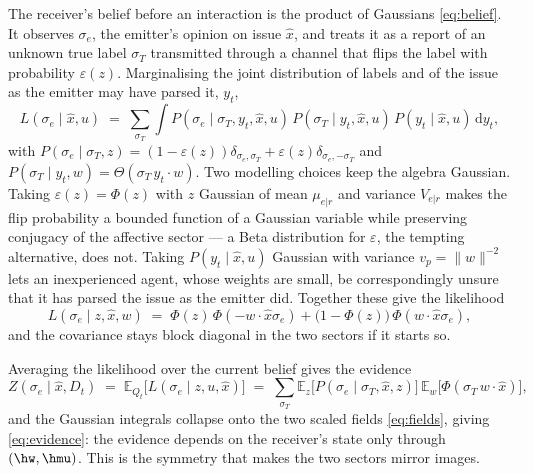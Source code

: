 The receiver's belief before an interaction is the product of Gaussians
\eqref{eq:belief}. It observes $\sigma_e$, the emitter's opinion on issue
$\hat{x}$, and treats it as a report of an unknown true label $\sigma_T$
transmitted through a channel that flips the label with probability
$\varepsilon(z)$. Marginalising the joint distribution of labels and of the issue
as the emitter may have parsed it, $y_t$,
%
\begin{equation}
  L(\sigma_e\mid \hat{x}, u) \;=\;
  \sum_{\sigma_T}\int P(\sigma_e\mid \sigma_T, y_t, \hat{x}, u)\,
  P(\sigma_T\mid y_t, \hat{x}, u)\,P(y_t\mid \hat{x}, u)\,\mathrm{d}y_t ,
\end{equation}
%
with $P(\sigma_e\mid\sigma_T,z)=(1-\varepsilon(z))\delta_{\sigma_e,\sigma_T} +
\varepsilon(z)\delta_{\sigma_e,-\sigma_T}$ and
$P(\sigma_T\mid y_t,w)=\Theta(\sigma_T\, y_t\cdot w)$. Two modelling choices keep
the algebra Gaussian. Taking $\varepsilon(z)=\Phi(z)$ with $z$ Gaussian of mean
$\mu_{e|r}$ and variance $V_{e|r}$ makes the flip probability a bounded function
of a Gaussian variable while preserving conjugacy of the affective sector --- a
Beta distribution for $\varepsilon$, the tempting alternative, does not. Taking
$P(y_t\mid \hat{x},u)$ Gaussian with variance $v_p=\|w\|^{-2}$ lets an
inexperienced agent, whose weights are small, be correspondingly unsure that it
has parsed the issue as the emitter did. Together these give the likelihood
%
\begin{equation}
  L(\sigma_e\mid z, \hat{x}, w) \;=\;
  \Phi(z)\,\Phi(-w\cdot\hat{x}\sigma_e)
  + \bigl(1-\Phi(z)\bigr)\,\Phi(w\cdot\hat{x}\sigma_e),
  \label{eq:likelihood}
\end{equation}
%
and the covariance stays block diagonal in the two sectors if it starts so.

Averaging the likelihood over the current belief gives the evidence
%
\begin{equation}
  Z(\sigma_e\mid \hat{x}, D_t) \;=\; \mathbb{E}_{Q_t}\bigl[L(\sigma_e\mid z, u, \hat{x})\bigr]
  \;=\;\sum_{\sigma_T}\mathbb{E}_z\bigl[P(\sigma_e\mid\sigma_T,\hat{x},z)\bigr]\,
  \mathbb{E}_w\bigl[\Phi(\sigma_T\, w\cdot\hat{x})\bigr],
\end{equation}
%
and the Gaussian integrals collapse onto the two scaled fields
\eqref{eq:fields}, giving \eqref{eq:evidence}: the evidence depends on the
receiver's state only through $(\hw,\hmu)$. This is the symmetry that makes the
two sectors mirror images.

